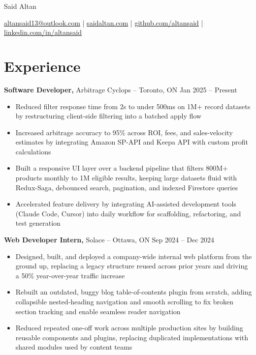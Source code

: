 \documentclass[11pt]{article}       %
\begin{document}
\centerline{\Huge Said Altan}

\vspace{10pt}

\centerline{\href{mailto:altansaid13@outlook.com}{altansaid13@outlook.com} | \href{https://saidaltan.com}{saidaltan.com} | \href{https://github.com/altansaid}{github.com/altansaid} | \href{https://www.linkedin.com/in/altansaid}{linkedin.com/in/altansaid}}


\vspace{5pt}
\section*{Experience}
\textbf{Software Developer,} {Arbitrage Cyclops} -- Toronto, ON \hfill Jan 2025 -- Present \\
\vspace{-9pt}
\begin{itemize}
  \item Reduced filter response time from 2s to under 500ms on 1M+ record datasets by restructuring client-side filtering into a batched apply flow
  \item Increased arbitrage accuracy to 95\% across ROI, fees, and sales-velocity estimates by integrating Amazon SP-API and Keepa API with custom profit calculations
  \item Built a responsive UI layer over a backend pipeline that filters 800M+ products monthly to 1M eligible results, keeping large datasets fluid with Redux-Saga, debounced search, pagination, and indexed Firestore queries
  \item Accelerated feature delivery by integrating AI-assisted development tools (Claude Code, Cursor) into daily workflow for scaffolding, refactoring, and test generation

\end{itemize}



\textbf{Web Developer Intern,} {Solace} -- Ottawa, ON \hfill Sep 2024 -- Dec 2024 \\
\vspace{-9pt}
\begin{itemize}
  \item Designed, built, and deployed a company-wide internal web platform from the ground up, replacing a legacy structure reused across prior years and driving a 50\% year-over-year traffic increase
  \item Rebuilt an outdated, buggy blog table-of-contents plugin from scratch, adding collapsible nested-heading navigation and smooth scrolling to fix broken section tracking and enable seamless reader navigation
  \item Reduced repeated one-off work across multiple production sites by building reusable components and plugins, replacing duplicated implementations with shared modules used by content teams

\end{itemize}
\end{document}
